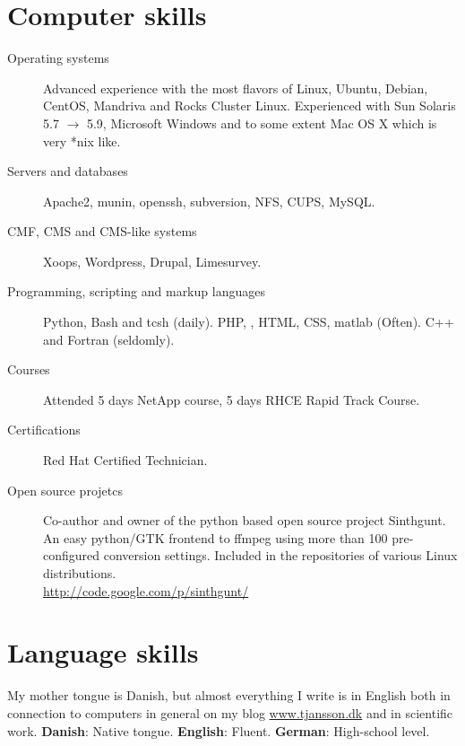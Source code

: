 \documentclass[margin,line,a4paper]{resume05}
\begin{document}
\begin{resume}
    
    

\section{\mysidestyle Computer skills}\vspace{1mm}
\begin{description}
\item[Operating systems] Advanced experience with the most flavors of Linux, Ubuntu,
    Debian, CentOS, Mandriva and Rocks Cluster Linux. Experienced with Sun
    Solaris 5.7 $\rightarrow$ 5.9, Microsoft Windows and to some extent Mac OS
    X which is very *nix like.
    \item[Servers and databases] Apache2, munin, openssh, subversion, NFS, CUPS, MySQL.
    \item[CMF, CMS and CMS-like systems] Xoops, Wordpress, Drupal, Limesurvey.
    \item[Programming, scripting and markup languages] Python, Bash and
    tcsh (daily). PHP, \LaTeXe, HTML, CSS, matlab (Often). C++ and Fortran (seldomly).
    \item[Courses] Attended 5 days NetApp course, 5 days RHCE Rapid Track Course.  
    \item[Certifications] Red Hat Certified Technician.  
    \item[Open source projetcs] Co-author and owner of the python based open
    source project Sinthgunt.  An easy python/GTK frontend to ffmpeg using more
    than 100 pre-configured conversion settings. Included in the repositories
    of various Linux distributions.\\ \url{http://code.google.com/p/sinthgunt/}
\end{description}
    

\section{\mysidestyle Language skills}
    My mother tongue is Danish, but almost everything I write is in English both in
    connection to computers in general on my blog \url{www.tjansson.dk} and in
    scientific work. \textbf{Danish}: Native tongue. \textbf{English}: Fluent.
    \textbf{German}: High-school level.

\end{resume}
\end{document}
